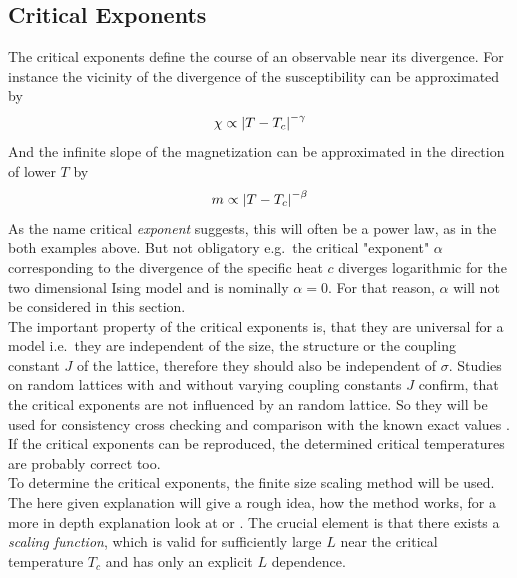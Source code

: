 \subsection{Critical Exponents}
    The critical exponents define the course of an observable near its
    divergence. For instance the vicinity of the divergence of the susceptibility
    can be approximated by
    \begin{equation}
        \chi \propto \left\vert T-T_{c}\right\vert^{-\gamma}
        \label{eq:critExp:gamma}
    \end{equation}
    And the infinite slope of the magnetization can be approximated in
    the direction of lower \(T\) by
    \begin{equation}
        m \propto \left\vert T-T_{c}\right\vert^{-\beta}
        \label{eq:critExp:beta}
    \end{equation}
    As the name critical \emph{exponent} suggests, this will often
    be a power law, as in the both examples above. But not obligatory e.g.\
    the critical "exponent" \(\alpha\) corresponding to the divergence of
    the specific heat \(c\) diverges logarithmic for the two dimensional
    Ising model and is nominally \(\alpha = 0\).
    For that reason, \(\alpha\) will not be considered in this section.\\
    The important property of the critical exponents is, that they are
    universal for a model i.e.\ they are independent of the size, the structure
    or the coupling constant \(J\) \cite{NewmanBarkema1999} of the lattice,
    therefore they should also be independent of \(\sigma\).
    Studies on random lattices with\cite{Lima2000} and without\cite{Janke1994}
    varying coupling constants \(J\) confirm, that the
    critical exponents are not influenced by an random lattice.
    So they will be used for consistency cross checking and
    comparison with the known exact values \cite[p. 59]{Pelissetto2002}.
    If the critical exponents can be reproduced, the determined critical
    temperatures are probably correct too.\\
    To determine the critical exponents, the finite size scaling method
    will be used. The here given explanation will give a rough idea, how
    the method works, for a more in depth explanation look at \cite{Norrenbrock2011} or \cite{NewmanBarkema1999}.
    The crucial element is that there exists a \emph{scaling function},
    which is valid for sufficiently large \(L\) near the critical
    temperature \(T_{c}\) and has only an explicit \(L\) dependence.
